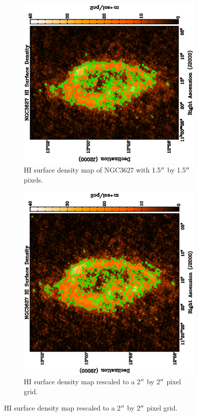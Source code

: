 \begin{figure}
  \centering
  \begin{subfigure}[t]{.48\textwidth}
    \centering
    \includegraphics[width=1.\linewidth, angle=270]{obs_imgs/HI_orig.eps}
    \caption{HI surface density map of NGC3627 with 1.5$\mbox{$^{\prime\prime}$}$ by 1.5$\mbox{$^{\prime\prime}$}$ pixels.}
  \end{subfigure}%
  \quad
  \begin{subfigure}[t]{.48\textwidth}
    \centering
    \includegraphics[width=1.\linewidth, angle=270]{obs_imgs/HI_align.eps}
    \caption{HI surface density map rescaled to a 2$\mbox{$^{\prime\prime}$}$ by 2$\mbox{$^{\prime\prime}$}$ pixel grid.}
  \end{subfigure}%


\end{figure}
